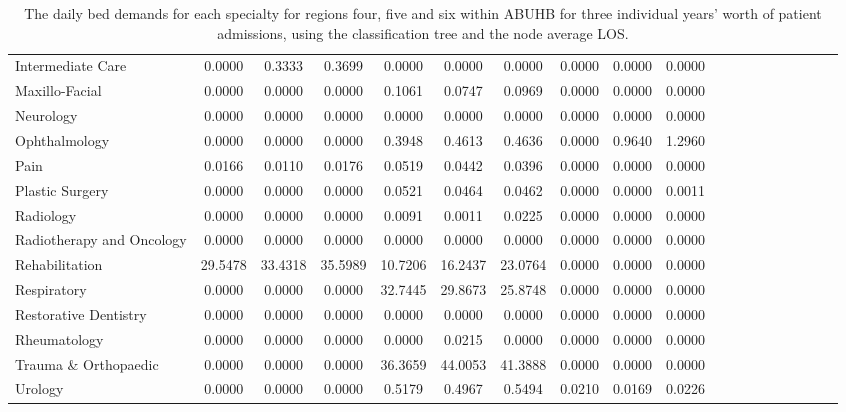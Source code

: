 \documentclass[thesis.tex]{subfiles}
\begin{document}
\begin{landscape}
\begin{table}[h!]
{\begin{tabular}{lcccccccccccccccccc}
Intermediate Care&	0.0000&	0.3333&	0.3699&	0.0000&	0.0000&	0.0000&	0.0000&	0.0000&	0.0000\\
Maxillo-Facial&	0.0000&	0.0000&	0.0000&	0.1061&	0.0747&	0.0969&	0.0000&	0.0000&	0.0000\\
Neurology&	0.0000&	0.0000&	0.0000&	0.0000&	0.0000&	0.0000&	0.0000&	0.0000&	0.0000\\
Ophthalmology&	0.0000&	0.0000&	0.0000&	0.3948&	0.4613&	0.4636&	0.0000&	0.9640&	1.2960\\
Pain&	0.0166&	0.0110&	0.0176&	0.0519&	0.0442&	0.0396&	0.0000&	0.0000&	0.0000\\
Plastic Surgery&	0.0000&	0.0000&	0.0000&	0.0521&	0.0464&	0.0462&	0.0000&	0.0000&	0.0011\\
Radiology&	0.0000&	0.0000&	0.0000&	0.0091&	0.0011&	0.0225&	0.0000&	0.0000&	0.0000\\
Radiotherapy and Oncology&	0.0000&	0.0000&	0.0000&	0.0000&	0.0000&	0.0000&	0.0000&	0.0000&	0.0000\\
Rehabilitation&	29.5478&	33.4318&	35.5989&	10.7206&	16.2437&	23.0764&	0.0000&	0.0000&	0.0000\\
Respiratory&	0.0000&	0.0000&	0.0000&	32.7445&	29.8673&	25.8748&	0.0000&	0.0000&	0.0000\\
Restorative Dentistry&	0.0000&	0.0000&	0.0000&	0.0000&	0.0000&	0.0000&	0.0000&	0.0000&	0.0000\\
Rheumatology&	0.0000&	0.0000&	0.0000&	0.0000&	0.0215&	0.0000&	0.0000&	0.0000&	0.0000\\
Trauma \& Orthopaedic&	0.0000&	0.0000&	0.0000&	36.3659&	44.0053&	41.3888&	0.0000&	0.0000&	0.0000\\
Urology&	0.0000&	0.0000&	0.0000&	0.5179&	0.4967&	0.5494&	0.0210&	0.0169&	0.0226\\
\bottomrule


    \end{tabular}  } 
    \caption{The daily bed demands for each specialty for regions four, five and six within ABUHB for three individual years’ worth of patient admissions, using the classification tree and the node average LOS.}
    \label{apptab:LinkedDemands7b}
\end{table}
\end{landscape}
\end{document}
